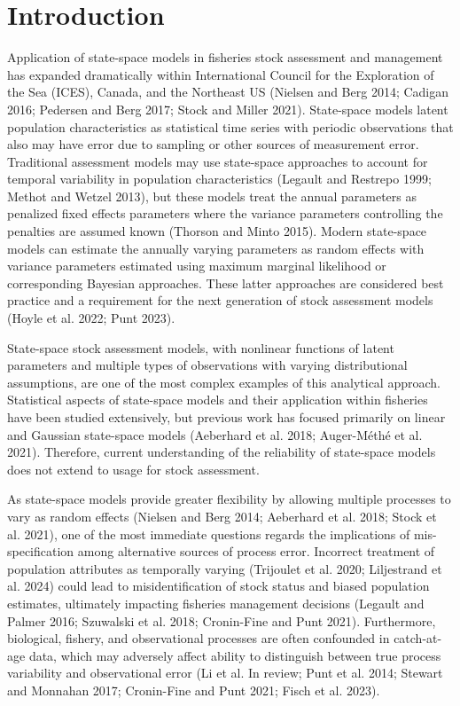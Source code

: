 \documentclass[
  12pt,
]{article}
\begin{document}
\pagebreak

\pagebreak

\hypertarget{introduction}{%
\section*{Introduction}\label{introduction}}

Application of state-space models in fisheries stock assessment and
management has expanded dramatically within International Council for
the Exploration of the Sea (ICES), Canada, and the Northeast US (Nielsen
and Berg 2014; Cadigan 2016; Pedersen and Berg 2017; Stock and Miller
2021). State-space models latent population characteristics as
statistical time series with periodic observations that also may have
error due to sampling or other sources of measurement error. Traditional
assessment models may use state-space approaches to account for temporal
variability in population characteristics (Legault and Restrepo 1999;
Methot and Wetzel 2013), but these models treat the annual parameters as
penalized fixed effects parameters where the variance parameters
controlling the penalties are assumed known (Thorson and Minto 2015).
Modern state-space models can estimate the annually varying parameters
as random effects with variance parameters estimated using maximum
marginal likelihood or corresponding Bayesian approaches. These latter
approaches are considered best practice and a requirement for the next
generation of stock assessment models (Hoyle et al. 2022; Punt 2023).

State-space stock assessment models, with nonlinear functions of latent
parameters and multiple types of observations with varying
distributional assumptions, are one of the most complex examples of this
analytical approach. Statistical aspects of state-space models and their
application within fisheries have been studied extensively, but previous
work has focused primarily on linear and Gaussian state-space models
(Aeberhard et al. 2018; Auger-Méthé et al. 2021). Therefore, current
understanding of the reliability of state-space models does not extend
to usage for stock assessment.

As state-space models provide greater flexibility by allowing multiple
processes to vary as random effects (Nielsen and Berg 2014; Aeberhard et
al. 2018; Stock et al. 2021), one of the most immediate questions
regards the implications of mis-specification among alternative sources
of process error. Incorrect treatment of population attributes as
temporally varying (Trijoulet et al. 2020; Liljestrand et al. 2024)
could lead to misidentification of stock status and biased population
estimates, ultimately impacting fisheries management decisions (Legault
and Palmer 2016; Szuwalski et al. 2018; Cronin-Fine and Punt 2021).
Furthermore, biological, fishery, and observational processes are often
confounded in catch-at-age data, which may adversely affect ability to
distinguish between true process variability and observational error (Li
et al. In review; Punt et al. 2014; Stewart and Monnahan 2017;
Cronin-Fine and Punt 2021; Fisch et al. 2023).
\end{document}
